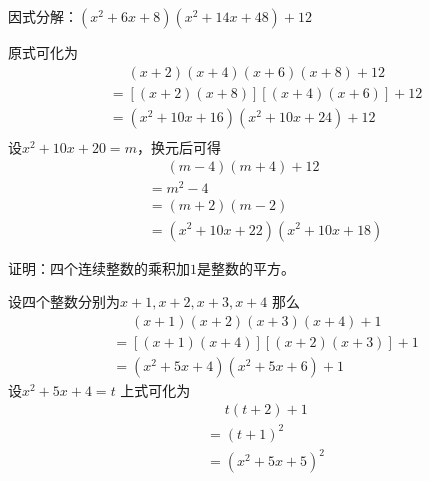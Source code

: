 \documentclass[windows,csize4,answers]{BHCexam}
\begin{document}
\begin{groups}
\begin{questions}[]
        \question[5] 因式分解：$(x^2+6x+8)(x^2+14x+48)+12$
        \begin{solution}{0.5cm}
            \methodonly 原式可化为
            \[
                \begin{aligned}
                     & \phantom{=}(x+2)(x+4)(x+6)(x+8)+12 \\
                     & = [(x+2)(x+8)][(x+4)(x+6)]+12      \\
                     & = (x^2+10x+16)(x^2+10x+24) + 12    \\
                \end{aligned}
            \]
            设$x^2+10x+20=m$，换元后可得
            \[
                \begin{aligned}
                     & \phantom{=}(m-4)(m+4)+12   \\
                     & = m^2-4                    \\
                     & = (m+2)(m-2)               \\
                     & = (x^2+10x+22)(x^2+10x+18)
                \end{aligned}
            \]
        \end{solution}
        \vspace{3.5cm}


        \question[5] 证明：四个连续整数的乘积加$1$是整数的平方。
        \begin{solution}{0.5cm}
            \methodonly 设四个整数分别为$x+1,x+2,x+3,x+4$ 那么
            \[
                \begin{aligned}
                     & \phantom{=}(x+1)(x+2)(x+3)(x+4)+1 \\
                     & = [(x+1)(x+4)][(x+2)(x+3)]+1      \\
                     & = (x^2+5x+4)(x^2+5x+6) +1
                \end{aligned}
            \]
            设$x^2+5x+4=t$ 上式可化为
            \[
                \begin{aligned}
                     & \phantom{=}t(t+2)+1 \\
                     & = (t+1)^2           \\
                     & = (x^2+5x+5)^2
                \end{aligned}
            \]
        \end{solution}
        \vspace{3.5cm}


\end{questions}
\end{groups}
\end{document}

